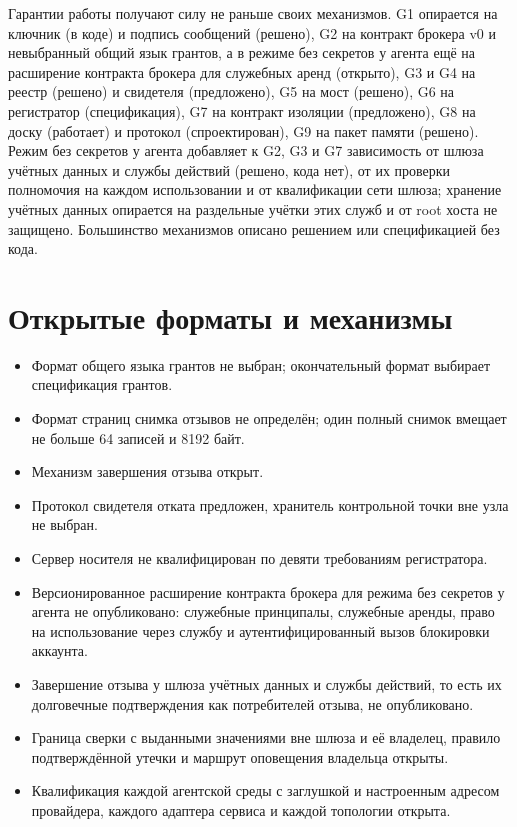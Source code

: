 \documentclass[10pt,a4paper]{article}
\begin{document}
Гарантии работы получают силу не раньше своих механизмов. G1 опирается на ключник (в коде) и подпись сообщений (решено), G2 на контракт брокера v0 и невыбранный общий язык грантов, а в режиме без секретов у агента ещё на расширение контракта брокера для служебных аренд (открыто), G3 и G4 на реестр (решено) и свидетеля (предложено), G5 на мост (решено), G6 на регистратор (спецификация), G7 на контракт изоляции (предложено), G8 на доску (работает) и протокол (спроектирован), G9 на пакет памяти (решено). Режим без секретов у агента добавляет к G2, G3 и G7 зависимость от шлюза учётных данных и службы действий (решено, кода нет), от их проверки полномочия на каждом использовании и от квалификации сети шлюза; хранение учётных данных опирается на раздельные учётки этих служб и от root хоста не защищено. Большинство механизмов описано решением или спецификацией без кода.

\section{Открытые форматы и механизмы}

\begin{itemize}
\item Формат общего языка грантов не выбран; окончательный формат выбирает спецификация грантов.
\item Формат страниц снимка отзывов не определён; один полный снимок вмещает не больше 64 записей и 8192 байт.
\item Механизм завершения отзыва открыт.
\item Протокол свидетеля отката предложен, хранитель контрольной точки вне узла не выбран.
\item Сервер носителя не квалифицирован по девяти требованиям регистратора.
\item Версионированное расширение контракта брокера для режима без секретов у агента не опубликовано: служебные принципалы, служебные аренды, право на использование через службу и аутентифицированный вызов блокировки аккаунта.
\item Завершение отзыва у шлюза учётных данных и службы действий, то есть их долговечные подтверждения как потребителей отзыва, не опубликовано.
\item Граница сверки с выданными значениями вне шлюза и её владелец, правило подтверждённой утечки и маршрут оповещения владельца открыты.
\item Квалификация каждой агентской среды с заглушкой и настроенным адресом провайдера, каждого адаптера сервиса и каждой топологии открыта.
\end{itemize}
\end{document}
